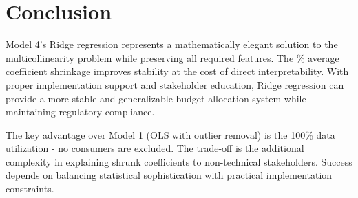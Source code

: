 \section{Conclusion}

Model 4's Ridge regression represents a mathematically elegant solution to the multicollinearity problem while preserving all required features. The \ModelFourShrinkageFactor{}\% average coefficient shrinkage improves stability at the cost of direct interpretability. With proper implementation support and stakeholder education, Ridge regression can provide a more stable and generalizable budget allocation system while maintaining regulatory compliance.

The key advantage over Model 1 (OLS with outlier removal) is the 100\% data utilization - no consumers are excluded. The trade-off is the additional complexity in explaining shrunk coefficients to non-technical stakeholders. Success depends on balancing statistical sophistication with practical implementation constraints.